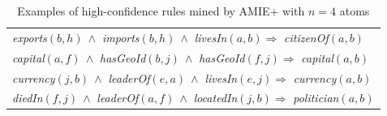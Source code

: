 {\small \vspace{0.5cm}
\begin{table}
\hspace*{-2.4ex}
\begin{tabular}{|l|}
\hline
\emph{exports}$(b,h)\ \wedge$ \emph{imports}$(b,h)\ \wedge$ \emph{livesIn}$(a,b) \Rightarrow $ \emph{citizenOf}$(a,b)$\\
\emph{capital}$(a,f)\ \wedge$ \emph{hasGeoId}$(b,j)\ \wedge$ \emph{hasGeoId}$(f,j) \Rightarrow$ \emph{capital}$(a,b)$ \\
\emph{currency}$(j,b)\ \wedge$ \emph{leaderOf}$(e,a)\ \wedge$ \emph{livesIn}$(e,j) \Rightarrow $ \emph{currency}$(a,b)$\\
\emph{diedIn}$(f,j)\ \wedge$ \emph{leaderOf}$(a,f)\ \wedge$ \emph{locatedIn}$(j,b) \Rightarrow $ \emph{politician}$(a,b)$\\
\hline
\end{tabular}
\caption{Examples of high-confidence rules mined by AMIE+ with $n=4$ atoms}
\label{rules4atoms}
\end{table}
}
\vspace{-0.5cm}

